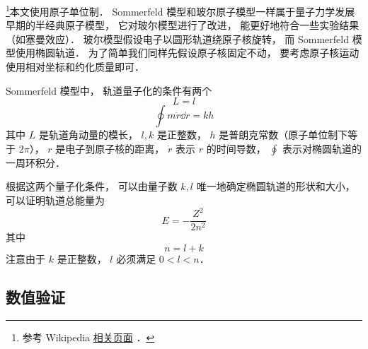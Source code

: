 

\footnote{参考 Wikipedia \href{https://en.wikipedia.org/wiki/Old_quantum_theory}{相关页面}
．}本文使用原子单位制． Sommerfeld 模型和玻尔原子模型一样属于量子力学发展早期的半经典原子模型， 它对玻尔模型进行了改进， 能更好地符合一些实验结果（如塞曼效应）． 玻尔模型假设电子以圆形轨道绕原子核旋转， 而 Sommerfeld 模型使用椭圆轨道． 为了简单我们同样先假设原子核固定不动， 要考虑原子核运动使用相对坐标和约化质量即可．

Sommerfeld 模型中， 轨道量子化的条件有两个
\begin{equation}\label{BohrEc_eq4}
L = l
\end{equation}
\begin{equation}\label{BohrEc_eq3}
\oint m\dot r \dd{r} = kh
\end{equation}
其中 $L$ 是轨道角动量的模长， $l, k$ 是正整数， $h$ 是普朗克常数（原子单位制下等于 $2\pi$）， $r$ 是电子到原子核的距离， $\dot r$ 表示 $r$ 的时间导数， $\oint$ 表示对椭圆轨道的一周环积分．

根据这两个量子化条件， 可以由量子数 $k, l$ 唯一地确定椭圆轨道的形状和大小， 可以证明轨道总能量为
\begin{equation}\label{BohrEc_eq5}
E = -\frac{Z^2}{2n^2}
\end{equation}
其中
\begin{equation}\label{BohrEc_eq2}
n = l + k
\end{equation}
注意由于 $k$ 是正整数， $l$ 必须满足 $0 < l < n$．

\subsection{数值验证}

